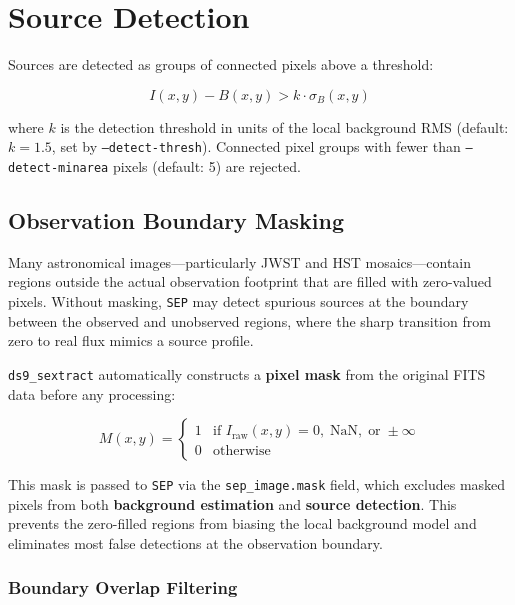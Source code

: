 \documentclass[11pt,fleqn]{book}
\newcommand{\sextract}{\texttt{ds9\_sextract}}
\newcommand{\sep}{\texttt{SEP}}
\begin{document}
\section{Source Detection}

Sources are detected as groups of connected pixels above a threshold:

\begin{equation}
I(x,y) - B(x,y) > k \cdot \sigma_B(x,y)
\end{equation}

where $k$ is the detection threshold in units of the local background RMS (default: $k = 1.5$, set by \texttt{--detect-thresh}). Connected pixel groups with fewer than \texttt{--detect-minarea} pixels (default: 5) are rejected.

\subsection{Observation Boundary Masking}
\label{subsec:mask}

Many astronomical images---particularly JWST and HST mosaics---contain regions outside the actual observation footprint that are filled with zero-valued pixels. Without masking, \sep{} may detect spurious sources at the boundary between the observed and unobserved regions, where the sharp transition from zero to real flux mimics a source profile.

\sextract{} automatically constructs a \textbf{pixel mask} from the original FITS data before any processing:

\begin{equation}
M(x,y) = \begin{cases}
1 & \text{if } I_{\mathrm{raw}}(x,y) = 0, \; \mathrm{NaN}, \; \text{or} \; \pm\infty \\
0 & \text{otherwise}
\end{cases}
\end{equation}

This mask is passed to \sep{} via the \texttt{sep\_image.mask} field, which excludes masked pixels from both \textbf{background estimation} and \textbf{source detection}. This prevents the zero-filled regions from biasing the local background model and eliminates most false detections at the observation boundary.

\subsubsection*{Boundary Overlap Filtering}
\end{document}
